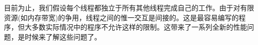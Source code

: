 目前为止，我们假设每个线程都独立于所有其他线程完成自己的工作。由于对有限资源(如内存带宽)的争用，线程之间的惟一交互是间接的。这是最容易编写的程序，但大多数实际情况中的程序不允许这样的限制。这带来了一系列全新的性能问题，是时候来了解这些问题了。


















